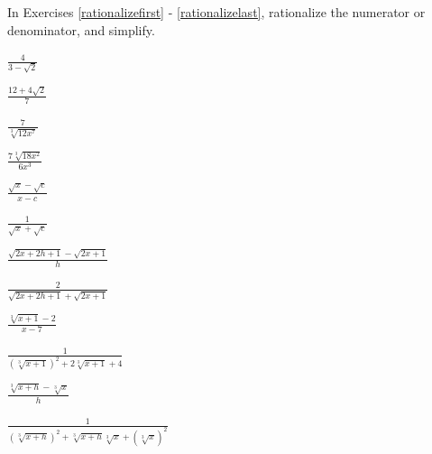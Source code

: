 \documentclass{ximera}
\begin{document}
\begin{question}

In Exercises \ref{rationalizefirst} - \ref{rationalizelast}, rationalize the numerator or denominator, and simplify.

\begin{problem} \label{rationalizefirst}
$\frac{4}{3 - \sqrt{2}}$ 

\begin{solution}
$\frac{12 + 4\sqrt{2}}{7}$ 
\end{solution}
\end{problem}

\begin{problem}
$\frac{7}{\sqrt[3]{12x^7}}$

\begin{solution}
$\frac{7 \sqrt[3]{18x^2}}{6x^3}$
\end{solution}
\end{problem}

\begin{problem}
$\frac{\sqrt{x} - \sqrt{c}}{x - c}$

\begin{solution}
$\frac{1}{\sqrt{x}+ \sqrt{c}}$
\end{solution}
\end{problem}

\begin{problem}
$\frac{\sqrt{2x+2h+1} - \sqrt{2x+1}}{h}$ 

\begin{solution}
$\frac{2}{\sqrt{2x+2h+1} + \sqrt{2x+1}}$     
\end{solution}
\end{problem}

\begin{problem}
$\frac{\sqrt[3]{x+1} - 2}{x- 7}$

\begin{solution}
 $\frac{1}{(\sqrt[3]{x+1})^2 + 2\sqrt[3]{x+1} + 4}$     
\end{solution}
\end{problem}                

\begin{problem} \label{rationalizelast}
$\frac{\sqrt[3]{x+h} - \sqrt[3]{x}}{h}$

\begin{solution}
$\frac{1}{(\sqrt[3]{x+h})^2 + \sqrt[3]{x+h}\sqrt[3]{x} + (\sqrt[3]{x})^2}$
\end{solution}
\end{problem}

\end{question}
\end{document}
